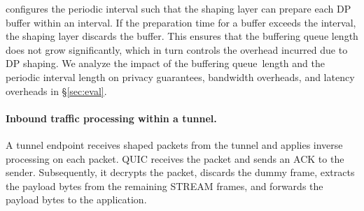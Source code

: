 {{\sys} configures the periodic interval such that the shaping layer can prepare
each DP buffer within an interval. If the preparation time for a buffer exceeds
the interval, the shaping layer discards the buffer. This ensures that the
buffering queue length does not grow significantly, which in turn controls the
overhead incurred due to DP shaping.
%
We analyze the impact of the buffering queue~length and the periodic interval
length on privacy guarantees, bandwidth overheads, and latency overheads in
\S\ref{sec:eval}.

\paragraph{Inbound traffic processing within a tunnel.}
A tunnel endpoint receives shaped packets from the tunnel and applies inverse
processing on each packet.
QUIC receives the packet and
sends an ACK to the sender. Subsequently, it decrypts the packet, discards the
dummy frame, extracts the payload bytes from the remaining STREAM frames, and
forwards the payload bytes to the application.



}
